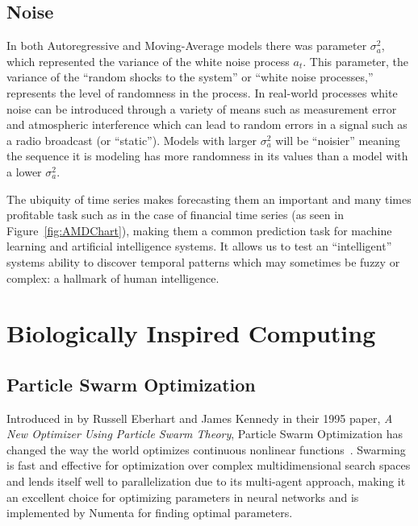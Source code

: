 \documentclass[oneside,12pt,openany]{book}
\begin{document}
    \section{Noise}
    
    In both Autoregressive and Moving-Average models there was parameter $\sigma_{a}^{2}$, which represented the variance of the white noise process $a_{t}$. This parameter, the variance of the ``random shocks to the system'' or ``white noise processes,'' represents the level of randomness in the process. In real-world processes white noise can be introduced through a variety of means such as measurement error and atmospheric interference which can lead to random errors in a signal such as a radio broadcast (or ``static''). Models with larger $\sigma_{a}^{2}$ will be ``noisier'' meaning the sequence it is modeling has more randomness in its values than a model with a lower $\sigma_{a}^{2}$.
	
	The ubiquity of time series makes forecasting them an important and many times profitable task such as in the case of financial time series (as seen in Figure~\ref{fig:AMDChart}), making them a common prediction task for machine learning and artificial intelligence systems. It allows us to test an ``intelligent'' systems ability to discover temporal patterns which may sometimes be fuzzy or complex: a hallmark of human intelligence.
	
	
	
	
	
	
	
	\chapter{Biologically Inspired Computing}
	
	\section{Particle Swarm Optimization}
	
	Introduced in by Russell Eberhart and James Kennedy in their 1995 paper, \textit{A New Optimizer Using Particle Swarm Theory}, Particle Swarm Optimization has changed the way the world optimizes continuous nonlinear functions~\cite{PSOReview}. Swarming is fast and effective for optimization over complex multidimensional search spaces and lends itself well to parallelization due to its multi-agent approach, making it an excellent choice for optimizing parameters in neural networks and is implemented by Numenta for finding optimal parameters.
	
\end{document}

